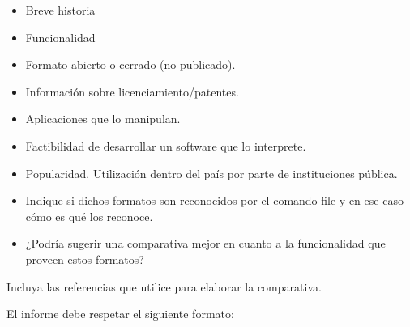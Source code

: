 \documentclass[12pt]{article}
\begin{document}
\begin{itemize}

    \item Breve historia

    \item Funcionalidad

    \item Formato abierto o cerrado (no publicado).

    \item Información sobre licenciamiento/patentes.

    \item Aplicaciones que lo manipulan.

    \item Factibilidad de desarrollar un software que lo interprete.

    \item Popularidad. Utilización dentro del país por parte de instituciones
    pública.

    \item Indique si dichos formatos son reconocidos por el comando file y en
    ese caso cómo es qué los reconoce.

    \item ¿Podría sugerir una comparativa mejor en cuanto a la funcionalidad
    que proveen estos formatos?

\end{itemize}

Incluya las referencias que utilice para elaborar la comparativa.

El informe debe respetar el siguiente formato:
\end{document}
